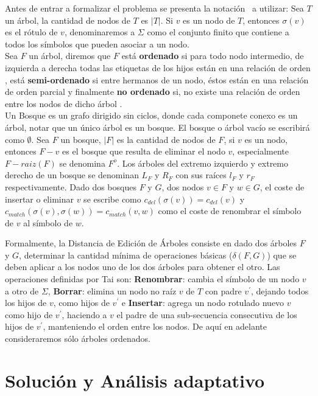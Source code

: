 \documentclass{article}
\begin{document}
Antes de entrar a formalizar el problema se presenta la notación \footnotemark \ a utilizar: Sea $T$ un árbol, la cantidad de nodos de $T$ es $|T|$. Si $v$ es un nodo de $T$, entonces $\sigma(v)$ es el rótulo de $v$, denominaremos a $\Sigma$ como el conjunto finito que contiene a todos los símbolos que pueden asociar a un nodo.
\\
Sea $F$ un árbol, diremos que $F$ está \textbf{ordenado} si para todo nodo intermedio, de izquierda a derecha todas las etiquetas de los hijos están en una relación de orden \cite{TED2}, está \textbf{semi-ordenado} si entre hermanos de un nodo, éstos están en una relación de orden parcial \cite{TED3} y finalmente \textbf{no ordenado} si, no existe una relación de orden entre los nodos de dicho árbol \cite{TED7}.
\\
Un Bosque es un grafo dirigido sin ciclos, donde cada componete conexo es un árbol, notar que un único árbol es un bosque. El bosque o árbol vacío se escribirá como $\emptyset$. Sea $F$ un bosque, $|F|$ es la cantidad de nodos de $F$, si $v$ es un nodo, entonces $F-v$ es el bosque que resulta de eliminar el nodo $v$, especialmente $F-raiz(F)$ se denomina $F^o$. Los árboles del extremo izquierdo y extremo derecho de un bosque se denominan $L_F$ y $R_F$ con sus raíces $l_F$ y $r_F$ respectivamente. Dado dos bosques $F$ y $G$, dos nodos $v\in F$ y $w\in G$, el coste de insertar o eliminar $v$ se escribe como $c_{del}(\sigma(v))=c_{del}(v)$ y $c_{match}(\sigma(v),\sigma(w))=c_{match}(v,w)$ como el coste de renombrar el símbolo de $v$ al símbolo de $w$.

Formalmente, la Distancia de Edición de Árboles consiste en dado dos árboles $F$ y $G$, determinar la cantidad mínima de operaciones básicas ($\delta(F,G)$) que se deben aplicar a los nodos uno de los dos árboles para obtener el otro. Las operaciones definidas por Tai \cite{TED1} son: \textbf{Renombrar}: cambia el símbolo de un nodo $v$ a otro de $\Sigma$, \textbf{Borrar}: elimina un nodo no raíz $v$ de $T$ con padre $v^\prime$, dejando todos los hijos de $v$, como hijos de $v^\prime$ e \textbf{Insertar}: agrega un nodo rotulado nuevo $v$ como hijo de $v^\prime$, haciendo a $v$ el padre de una sub-secuencia consecutiva de los hijos de $v^\prime$, manteniendo el orden entre los nodos.
De aquí en adelante consideraremos sólo árboles ordenados.

\section{Solución y Análisis adaptativo}
\end{document}
